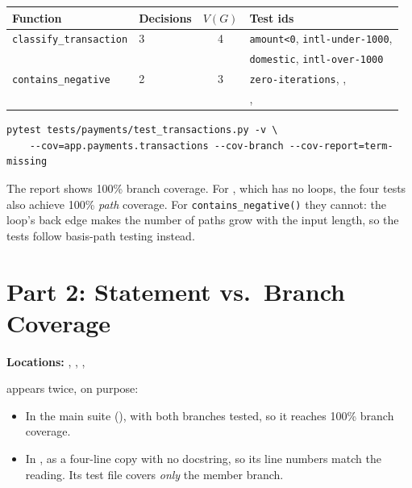 \documentclass[11pt]{article}
\begin{document}
\begin{center}
\footnotesize
\begin{tabular}{@{}llcL{7.6cm}@{}}
\toprule
\textbf{Function} & \textbf{Decisions} & \(V(G)\) & \textbf{Test ids} \\
\midrule
\texttt{classify\_transaction} & 3 & 4 & \texttt{amount<0}, \texttt{intl-under-1000},\\
 & & & \texttt{domestic}, \texttt{intl-over-1000} \\
\texttt{contains\_negative} & 2 & 3 & \texttt{zero-iterations}, ,\\
 & & & ,  \\
\bottomrule
\end{tabular}
\end{center}

\begin{lstlisting}[style=shellstyle]
pytest tests/payments/test_transactions.py -v \
    --cov=app.payments.transactions --cov-branch --cov-report=term-missing
\end{lstlisting}

The report shows 100\% branch coverage. For
, which has no loops, the four tests
also achieve 100\% \emph{path} coverage. For \texttt{contains\_negative()}
they cannot: the loop's back edge makes the number of paths grow with
the input length, so the tests follow basis-path testing instead.

\section{Part 2: Statement vs.\ Branch Coverage}
\textbf{Locations:} ,
,
,

 appears twice, on purpose:
\begin{itemize}
\item In the main suite (), with both
branches tested, so it reaches 100\% branch coverage.
\item In , as a four-line copy
with no docstring, so its line numbers match the reading. Its test
file covers \emph{only} the member branch.
\end{itemize}
\end{document}
